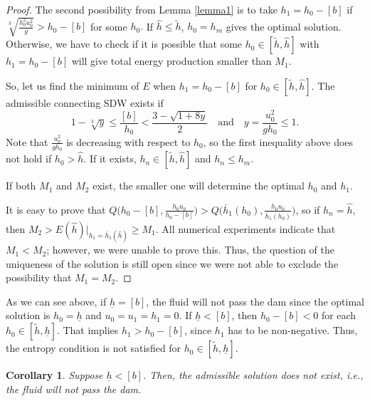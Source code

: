 \documentclass{article}
\theoremstyle{plain}
\newtheorem{corollary}{Corollary}[section]
\theoremstyle{definition}
\theoremstyle{remark}
\begin{document}
\begin{proof}
The second possibility from Lemma \ref{lemma1} is to take $h_1=h_0-[b]$ 
if $\sqrt[3]{\frac{h_0^2u_0^2}{g}}>h_0-[b]$ for some $h_0.$
If $\hat{h}\leq\tilde{h}$, $h_0=h_m$ gives the optimal solution.
Otherwise, we have to check if it is possible that some $h_0\in[\tilde{h},\hat{h}]$
with $h_1=h_0-[b]$ will give total energy production smaller than $M_1$.

So, let us find the minimum of $E$ when $h_1=h_0-[b]$ for $h_0\in[\tilde{h},\hat{h}]$. 
The admissible connecting SDW exists if
\[1-\sqrt[3]{y}\leq \frac{[b]}{h_0}<\frac{3-\sqrt{1+8y}}{2} \quad
\text{and} \quad y=\frac{u_0^2}{gh_0}\leq 1.\]
Note that $\frac{u_0^2}{gh_0}$ is decreasing with respect to $h_0$,
so the first inequality above does not hold if $h_0> \hat{h}$. 
If it exists, $h_n\in[\tilde{h},\hat{h}]$ and $h_n\leq h_m.$ 

If both $M_1$ and $M_2$ exist, the smaller one will determine the optimal $h_0$ and $h_1.$ 

It is easy to prove that $Q\big(h_0-[b],\frac{h_0u_0}{h_0-[b]}\big)
>Q\big(\bar{h}_1(h_0),\frac{h_0u_0}{\bar{h}_1(h_0)}\big)$, 
so if $h_n=\hat{h}$, then $M_2>E(\hat{h})\Big|_{h_1=\bar{h}_1(\hat{h})}\geq M_1$. 
All numerical experiments indicate that $M_1 < M_2$; however, we were unable to prove this. 
Thus, the question of the uniqueness of the solution is still open since 
we were not able to exclude the possibility that   $M_1=M_2.$
\end{proof}


As we can see above, if $\underline{h}=[b]$, the fluid will not pass the dam since the optimal solution is $h_0=\underline{h}$ and $u_0=u_1=h_1=0$. If $\underline{h}<[b]$, then $h_0-[b]<0$ for each $h_0\in[\tilde{h},\underline{h}]$.
That implies $h_1>h_0-[b]$, since $h_1$ has to be non-negative. Thus, the entropy condition is not satisfied for $h_0\in[\tilde{h},\underline{h}]$.
\begin{corollary}
Suppose $\underline{h}<[b]$. Then, the admissible solution does not exist, i.e.,  the fluid will not pass the dam.
\end{corollary}
\end{document}
